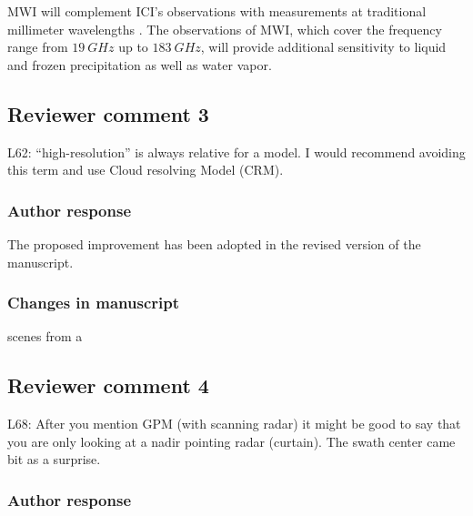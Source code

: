 \begin{change}[63]
 MWI will complement ICI's observations with measurements at traditional
 millimeter wavelengths \DIFaddbegin {}\DIFaddend . The observations of MWI, which
 cover the frequency range from $19\ \unit{GHz}$ up to $183\ \unit{GHz}$, will
 provide additional sensitivity to liquid and frozen precipitation as well as
 water vapor.
\end{change}

\subsection*{Reviewer comment 3}

L62: “high-resolution” is always relative for a model. I would recommend avoiding this term and use Cloud resolving Model (CRM).

\subsubsection*{Author response}

The proposed improvement has been adopted in the revised version of the manuscript.


\subsubsection{Changes in manuscript}

\begin{change}[75]
  \DIFaddbegin {}\DIFaddend scenes from a
  \DIFdelbegin {}\DIFdelend \DIFaddbegin {}\DIFaddend
\end{change}


\subsection*{Reviewer comment 4}

L68:  After you mention GPM (with scanning radar) it might be good to say that you are only looking at a nadir pointing radar (curtain).  The swath center came bit as a surprise.

\subsubsection*{Author response}

